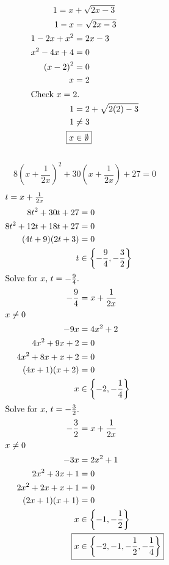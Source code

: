 	\subsection{}
		\[1 = x + \sqrt{2x - 3}\]
		\begin{align*}
			1 - x &= \sqrt{2x - 3} \\
			1 - 2x + x^2 &= 2x - 3 \\
			x^2 - 4x + 4 &= 0 \\
			{(x - 2)}^2 &= 0 \\
			x &= 2 \\
			\intertext{Check $x = 2$.}
			1 &= 2 + \sqrt{2(2) - 3} \\
			1 &\neq 3 \\
			\Aboxed{x &\in \emptyset}
		\end{align*}
		\pagebreak{}

	\subsection{}
		\[8{\left(x + \frac{1}{2x}\right)}^2 + 30\left(x + \frac{1}{2x}\right) + 27 = 0\]
		\begin{align*}
			\intertext{$t = x + \frac{1}{2x}$}
			8t^2 + 30t + 27 &= 0 \\
			8t^2 + 12t + 18t + 27 &= 0 \\
			(4t + 9)(2t + 3) &= 0 \\
			t &\in \left\{-\frac{9}{4}, -\frac{3}{2}\right\} \\
			\intertext{Solve for $x$, $t = -\frac{9}{4}$.}
			-\frac{9}{4} &= x + \frac{1}{2x} \\
			\intertext{$x \neq 0$}
			-9x &= 4x^2 + 2 \\
			4x^2 + 9x + 2 &= 0 \\
			4x^2 + 8x + x + 2 &= 0 \\
			(4x + 1)(x + 2) &= 0 \\
			x &\in \left\{-2, -\frac{1}{4}\right\} \\
			\intertext{Solve for $x$, $t = -\frac{3}{2}$.}
			-\frac{3}{2} &= x + \frac{1}{2x} \\
			\intertext{$x \neq 0$}
			-3x &= 2x^2 + 1 \\
			2x^2 + 3x + 1 &= 0 \\
			2x^2 + 2x + x + 1 &= 0 \\
			(2x + 1)(x + 1) &= 0 \\
			x &\in \left\{-1, -\frac{1}{2}\right\} \\
			\Aboxed{x &\in \left\{-2, -1, -\frac{1}{2}, -\frac{1}{4}\right\}}
		\end{align*}
		\pagebreak{}

